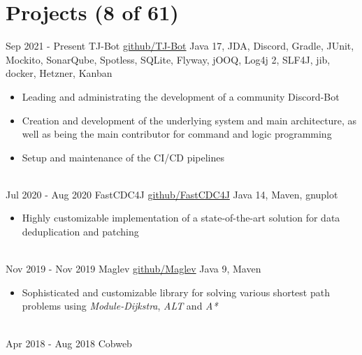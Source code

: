 \documentclass[letterpaper]{twentysecondcv} %
\begin{document}
\newpage
\makesidebarThird %


\section{Projects (8 of 61)}
\begin{twenty} %
	\twentyitem
    		{Sep 2021 -}
		{Present}
        		{TJ-Bot}
        		{\href{https://github.com/Together-Java/TJ-Bot}{github/TJ-Bot}}
        		{Java 17, JDA, Discord, Gradle, JUnit, Mockito, SonarQube, Spotless, SQLite, Flyway, jOOQ, Log4j 2, SLF4J, jib, docker, Hetzner, Kanban}
        		{\begin{itemize}
        			\item Leading and administrating the development of a community Discord-Bot
        			\item Creation and development of the underlying system and main architecture,
        			as well as being the main contributor for command and logic programming
        			\item Setup and maintenance of the CI/CD pipelines
        		\end{itemize}}\\
	\twentyitem
    		{Jul 2020 -}
		{Aug 2020}
        		{FastCDC4J}
        		{\href{https://github.com/Zabuzard/FastCDC4J}{github/FastCDC4J}}
        		{Java 14, Maven, gnuplot}
        		{\begin{itemize}
        			\item Highly customizable implementation of a state-of-the-art solution for data deduplication and patching
        		\end{itemize}}\\
	\twentyitem
    		{Nov 2019 -}
		{Nov 2019}
        		{Maglev}
        		{\href{https://github.com/Zabuzard/Maglev}{github/Maglev}}
        		{Java 9, Maven}
        		{\begin{itemize}
        			\item Sophisticated and customizable library for solving various shortest path problems using \textit{Module-Dijkstra}, \textit{ALT} and \textit{A*}
        		\end{itemize}}\\
	\twentyitem
    		{Apr 2018 -}
		{Aug 2018}
        		{Cobweb}

\end{twenty}
\end{document}

